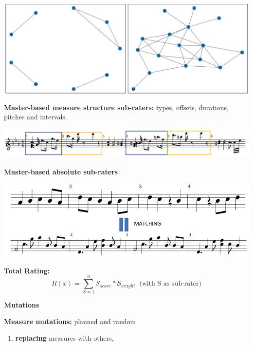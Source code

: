 \documentclass[a0,portrait]{a0poster}
\begin{document}
\begin{multicols}{2}
\begin{center}
	\includegraphics[width=\linewidth]{GodFather_1-2}
\end{center}
\Large{\textbf{Master-based measure structure sub-raters:} types, offsets, durations, pitches and intervals.}
\begin{center}
	\includegraphics[width=\linewidth]{beethoven_measures}
\end{center}
\Large{\textbf{Master-based absolute sub-raters}}
\begin{center}
	\includegraphics[width=1\linewidth]{absolute_matching}
\end{center}
\textbf{Total Rating:}
\LARGE\textbf{\[ R(x) = \sum_{S=1}^{n} S_{score} * S_{weight} \   \text{  (with S as sub-rater)}\]}
\begin{flushleft}
	\LARGE{\textbf{Mutations}}\\
\end{flushleft}
\Large{
\textbf{Measure mutations:} planned and random
\begin{enumerate} 
	\item \textbf{replacing} measures with others,

\end{enumerate}}
\end{multicols}
\end{document}
